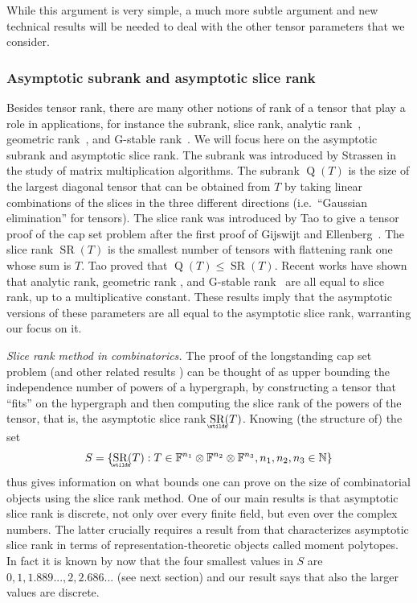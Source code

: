 \documentclass{daj}
\DeclareMathOperator{\subrank}{Q}
\DeclareMathOperator{\slicerank}{SR}
\DeclareMathOperator{\asympslicerank}{\underaccent{\wtilde}{SR}}
\newcommand{\FF}{\mathbb{F}}
\newcommand{\NN}{\mathbb{N}}
\begin{document}
While this argument is very simple, a much more subtle argument and new technical results will be needed to deal with the other tensor parameters that we consider.

\subsubsection*{Asymptotic subrank and asymptotic slice rank}

Besides tensor rank, there are many other notions of rank of a tensor that play a role in applications, for instance the subrank, slice rank,  analytic rank~\cite{MR2773103,MR3964143,10.1215/00127094-2022-0086}, geometric rank~\cite{KopMosZui:GeomRankSubrankMaMu}, and G-stable rank~\cite{MR4471036}. We will focus here on the asymptotic subrank and asymptotic slice rank. The subrank was introduced by Strassen \cite{MR882307} in the study of matrix multiplication algorithms. The subrank $\subrank(T)$ is the size of the largest diagonal tensor that can be obtained from $T$ by taking linear combinations of the slices in the three different directions (i.e.~``Gaussian elimination'' for tensors). The slice rank was introduced by Tao \cite{tao} to give a tensor proof of the cap set problem after the first proof of Gijswijt and Ellenberg~\cite{MR3583358}. The slice rank $\slicerank(T)$ is the smallest number of tensors with flattening rank one whose sum is $T$. Tao proved that $\subrank(T) \leq \slicerank(T)$.
Recent works have shown that analytic rank, geometric rank \cite{DBLP:conf/stoc/CohenM21,10.1215/00127094-2022-0086}, and G-stable rank~\cite{MR4471036} are all equal to slice rank, up to a multiplicative constant. These results imply that the asymptotic versions of these parameters are all equal to the asymptotic slice rank, warranting our focus on it.

\emph{Slice rank method in combinatorics.} The proof of the longstanding cap set problem \cite{tao, sawin} (and other related results \cite{naslund_sawin_2017}) can be thought of as upper bounding the independence number of powers of a hypergraph, by constructing a tensor that ``fits'' on the hypergraph and then computing the slice rank of the powers of the tensor, that is, the asymptotic slice rank $\asympslicerank(T)$. Knowing (the structure of) the set
\[
S = \{\asympslicerank(T) : T \in \FF^{n_1} \otimes \FF^{n_2} \otimes \FF^{n_3}, n_1, n_2, n_3 \in \NN\}
\]
thus gives information on what bounds one can prove on the size of combinatorial objects using the slice rank method.
One of our main results is that asymptotic slice rank is discrete, not only over every finite field, but even over the complex numbers. The latter crucially requires a result from \cite{MR4495838} that characterizes asymptotic slice rank in terms of representation-theoretic objects called moment polytopes. In fact it is known by now that the four smallest values in $S$ are $0, 1, 1.889..., 2, 2.686...$ (see next section) and our result says that also the larger values are discrete.
\end{document}
